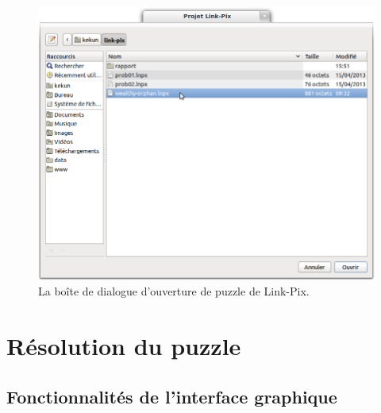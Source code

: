 \begin{figure}[b!]
      \centering
      \includegraphics[scale=0.5]{gui-2}
      \caption{La boîte de dialogue d'ouverture de puzzle de Link-Pix.}
      \label{chargement}
\end{figure}

\section{Résolution du puzzle}

\subsection{Fonctionnalités de l'interface graphique}

